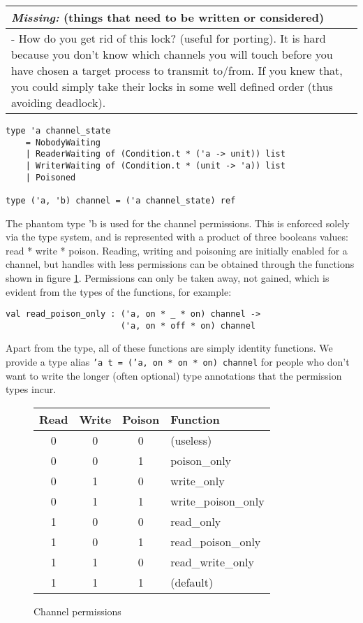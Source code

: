 \documentclass[11pt,oneside,a4paper]{article}
\newcommand{\missing}[1]{
\begin{tabular}{|p{11cm}|}
\hline
\emph{Missing:} {\scriptsize (things that need to be written or considered)} \\
\hline
#1
\hline
\end{tabular}
}
\begin{document}
\missing{
- How do you get rid of this lock? (useful for porting). It is hard because you don't know which
channels you will touch before you have chosen a target process to transmit to/from. If you knew
that, you could simply take their locks in some well defined order (thus avoiding deadlock). \\
}

\begin{verbatim}
type 'a channel_state
    = NobodyWaiting 
    | ReaderWaiting of (Condition.t * ('a -> unit)) list
    | WriterWaiting of (Condition.t * (unit -> 'a)) list
    | Poisoned

type ('a, 'b) channel = ('a channel_state) ref
\end{verbatim}

The phantom type 'b is used for the channel permissions. This is enforced solely via the type
system, and is represented with a product of three booleans values: read * write * poison.
Reading, writing and poisoning are initially enabled for a channel, but handles with less 
permissions can be obtained through the functions shown in figure \ref{channel-permissions}. 
Permissions can only be taken away, not gained, which is evident from the types of the 
functions, for example: 

\begin{verbatim}
val read_poison_only : ('a, on * _ * on) channel -> 
                       ('a, on * off * on) channel
\end{verbatim}

Apart from the type, all of these functions are simply identity functions. We provide a
type alias \texttt{'a t = ('a, on * on * on) channel} for people who don't want to write the
longer (often optional) type annotations that the permission types incur.

\begin{figure}[h]
\centering
\begin{tabular}{c|c|c|l}
Read & Write & Poison & Function \\
\hline
0 & 0 & 0 & (useless) \\
0 & 0 & 1 & poison\_only \\
0 & 1 & 0 & write\_only \\
0 & 1 & 1 & write\_poison\_only \\
1 & 0 & 0 & read\_only \\
1 & 0 & 1 & read\_poison\_only \\
1 & 1 & 0 & read\_write\_only \\
1 & 1 & 1 & (default) \\
\end{tabular}
\caption{Channel permissions}
\label{channel-permissions}
\end{figure}
\end{document}
